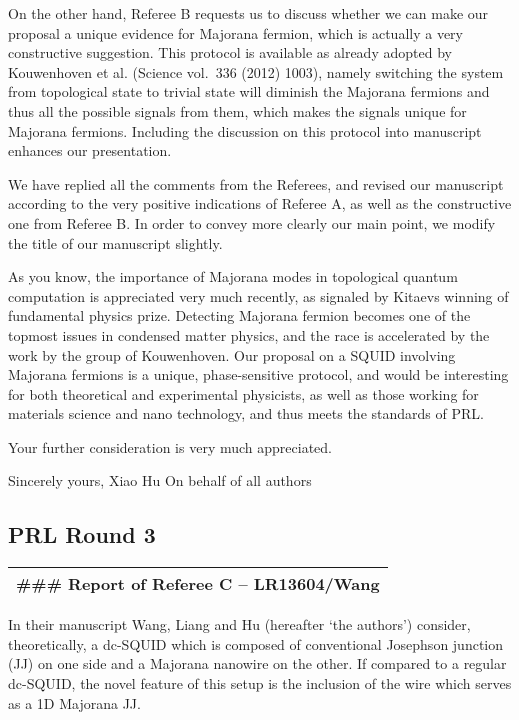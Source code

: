 \documentclass[11pt]{article}
\begin{document}
On the other hand, Referee B requests us to discuss whether we can make
our proposal a unique evidence for Majorana fermion, which is actually a
very constructive suggestion. This protocol is available as already
adopted by Kouwenhoven et al. (Science vol.~336 (2012) 1003), namely
switching the system from topological state to trivial state will
diminish the Majorana fermions and thus all the possible signals from
them, which makes the signals unique for Majorana fermions. Including
the discussion on this protocol into manuscript enhances our
presentation.

We have replied all the comments from the Referees, and revised our
manuscript according to the very positive indications of Referee A, as
well as the constructive one from Referee B. In order to convey more
clearly our main point, we modify the title of our manuscript slightly.

As you know, the importance of Majorana modes in topological quantum
computation is appreciated very much recently, as signaled by Kitaevs
winning of fundamental physics prize. Detecting Majorana fermion becomes
one of the topmost issues in condensed matter physics, and the race is
accelerated by the work by the group of Kouwenhoven. Our proposal on a
SQUID involving Majorana fermions is a unique, phase-sensitive protocol,
and would be interesting for both theoretical and experimental
physicists, as well as those working for materials science and nano
technology, and thus meets the standards of PRL.

Your further consideration is very much appreciated.

Sincerely yours, Xiao Hu On behalf of all authors

\hypertarget{prl-round-3}{%
\subsection{PRL Round 3}\label{prl-round-3}}

\begin{longtable}[]{@{}l@{}}
\toprule
\endhead
\#\#\# Report of Referee C -- LR13604/Wang\tabularnewline
\bottomrule
\end{longtable}

In their manuscript Wang, Liang and Hu (hereafter `the authors')
consider, theoretically, a dc-SQUID which is composed of conventional
Josephson junction (JJ) on one side and a Majorana nanowire on the
other. If compared to a regular dc-SQUID, the novel feature of this
setup is the inclusion of the wire which serves as a 1D Majorana JJ.
\end{document}

